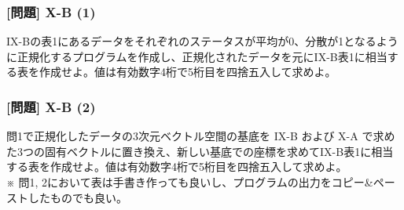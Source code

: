 \documentclass[dvipdfmx,aspectratio=169,20pt]{beamer}
\newcommand{\myfontsetting}[3]{{\fontsize{#1}{#2}\selectfont #3}}
\begin{document}
\begin{frame}
\frametitle{[問題] X-B (1)}

\myfontsetting{18pt}{20pt}{
I\hspace{-.1em}X-Bの表1にあるデータをそれぞれのステータスが平均が0、分散が1となるように正規化するプログラムを作成し、正規化されたデータを元にI\hspace{-.1em}X-B表1に相当する表を作成せよ。値は有効数字4桁で5桁目を四捨五入して求めよ。%
}
\end{frame}
\begin{frame}
\frametitle{[問題] X-B (2)}

\myfontsetting{18pt}{20pt}{
問1で正規化したデータの3次元ベクトル空間の基底を I\hspace{-.1em}X-B および X-A で求めた3つの固有ベクトルに置き換え、新しい基底での座標を求めてI\hspace{-.1em}X-B表1に相当する表を作成せよ。値は有効数字4桁で5桁目を四捨五入して求めよ。%
}\\
\myfontsetting{12pt}{12pt}{
※ 問1, 2において表は手書き作っても良いし、プログラムの出力をコピー\&ペーストしたものでも良い。
}

\end{frame}
\end{document}
